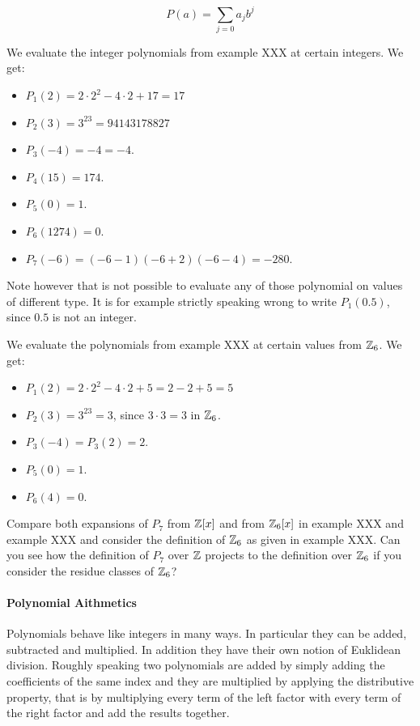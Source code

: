 \begin{equation}
P(a) = \sum_{j=0} a_j b^j
\end{equation}
\begin{example} We evaluate the integer polynomials from example XXX at certain integers. We get:
\begin{itemize}
\item $P_1(2)= 2\cdot 2^2 -4\cdot 2 +17 = 17$
\item $P_2(3)= 3^{23}=94143178827$
\item $P_3(-4)= -4 = -4$.
\item $P_4(15)= 174$.
\item $P_5(0)= 1$.
\item $P_6(1274)=0$.
\item $P_7(-6)= (-6-1)(-6+2)(-6-4) = -280$.
\end{itemize}
Note however that is not possible to evaluate any of those polynomial on values of different type. It is for example strictly speaking wrong to write $P_1(0.5)$, since $0.5$ is not an integer.
\end{example}
\begin{example} We evaluate the polynomials from example XXX at certain values from $\mathbb{Z}_6$. We get:
\begin{itemize}
\item $P_1(2)= 2\cdot 2^2 -4\cdot 2 +5 = 2 - 2 + 5 = 5$
\item $P_2(3)= 3^{23}=3$, since $3\cdot 3=3$ in $\mathbb{Z}_6$.
\item $P_3(-4)= P_3(2) = 2$.
\item $P_5(0)= 1$.
\item $P_6(4)=0$.
\end{itemize}
\end{example}
\begin{exercise}
Compare both expansions of $P_7$ from $\mathbb{Z}[x]$ and from $\mathbb{Z}_6[x]$ in example XXX and example XXX and consider the definition of $\mathbb{Z}_6$ as given in example XXX. Can you see how the definition of $P_7$ over $\mathbb{Z}$ projects to the definition over $\mathbb{Z}_6$ if you consider the residue classes of $\mathbb{Z}_6$?
\end{exercise}
\paragraph{Polynomial Aithmetics}
Polynomials behave like integers in many ways. In particular they can be added, subtracted and multiplied. In addition they have their own notion of Euklidean division. Roughly speaking two polynomials are added by simply adding the coefficients of the same index and they are multiplied by applying the distributive property, that is by multiplying every term of the left factor with every term of the right factor and add the results together.

